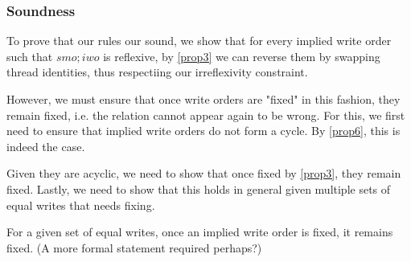 
    \subsubsection{Soundness}

        To prove that our rules our sound, we show that for every implied write order such that $smo;iwo$ is reflexive, by \ref{prop3} we can reverse them by swapping thread identities, thus respectiing our irreflexivity constraint. 
        
        However, we must ensure that once write orders are "fixed" in this fashion, they remain fixed, i.e. the relation cannot appear again to be wrong. 
        For this, we first need to ensure that implied write orders do not form a cycle. By \ref{prop6}, this is indeed the case. 
        
        Given they are acyclic, we need to show that once fixed by \ref{prop3}, they remain fixed. 
        Lastly, we need to show that this holds in general given multiple sets of equal writes that needs fixing.  


        \begin{lemma}
            For a given set of equal writes, once an implied write order is fixed, it remains fixed. 
            (A more formal statement required perhaps?)
        \end{lemma}
            

